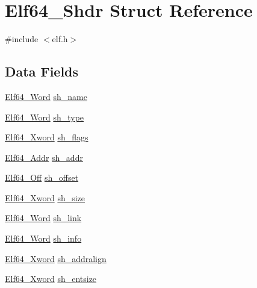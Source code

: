 \hypertarget{struct_elf64___shdr}{\section{Elf64\-\_\-\-Shdr Struct Reference}
\label{struct_elf64___shdr}
}


{\ttfamily \#include $<$elf.\-h$>$}

\subsection*{Data Fields}
\begin{DoxyCompactItemize}
\item 
\hyperlink{elf_8h_aa3aa1920ed115b7ef7e99716fece4401}{Elf64\-\_\-\-Word} \hyperlink{struct_elf64___shdr_a453ee62a9f52ee1e5d3c4e185e35e100}{sh\-\_\-name}
\item 
\hyperlink{elf_8h_aa3aa1920ed115b7ef7e99716fece4401}{Elf64\-\_\-\-Word} \hyperlink{struct_elf64___shdr_ad204bc45f1fa1d3cf3d14d502e585949}{sh\-\_\-type}
\item 
\hyperlink{elf_8h_a5447a48a3dae0bd24f606415268c6fe4}{Elf64\-\_\-\-Xword} \hyperlink{struct_elf64___shdr_a9697ac357b0d3744bf15b6d30af583c9}{sh\-\_\-flags}
\item 
\hyperlink{elf_8h_aeed51d08e3a950d637f8ec1f0cd4ef65}{Elf64\-\_\-\-Addr} \hyperlink{struct_elf64___shdr_ab3751166b9609d57a51f56092712637e}{sh\-\_\-addr}
\item 
\hyperlink{elf_8h_a6f7837bc80df7a68291fce54ff088849}{Elf64\-\_\-\-Off} \hyperlink{struct_elf64___shdr_a58905d4961e250e377b79404537bb31b}{sh\-\_\-offset}
\item 
\hyperlink{elf_8h_a5447a48a3dae0bd24f606415268c6fe4}{Elf64\-\_\-\-Xword} \hyperlink{struct_elf64___shdr_ac70a9525b3a3b7462397ef65244d3449}{sh\-\_\-size}
\item 
\hyperlink{elf_8h_aa3aa1920ed115b7ef7e99716fece4401}{Elf64\-\_\-\-Word} \hyperlink{struct_elf64___shdr_a57922dc7c9a88a56d9838fd81e9d6d72}{sh\-\_\-link}
\item 
\hyperlink{elf_8h_aa3aa1920ed115b7ef7e99716fece4401}{Elf64\-\_\-\-Word} \hyperlink{struct_elf64___shdr_ad8096e2889e2af3df907ee60653f62a1}{sh\-\_\-info}
\item 
\hyperlink{elf_8h_a5447a48a3dae0bd24f606415268c6fe4}{Elf64\-\_\-\-Xword} \hyperlink{struct_elf64___shdr_ac964d6e900deade6df35f60a3aa110b0}{sh\-\_\-addralign}
\item 
\hyperlink{elf_8h_a5447a48a3dae0bd24f606415268c6fe4}{Elf64\-\_\-\-Xword} \hyperlink{struct_elf64___shdr_aec7218de9050645a5f88eaea8ed51a7d}{sh\-\_\-entsize}
\end{DoxyCompactItemize}


